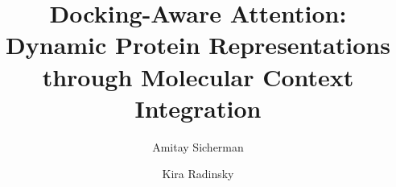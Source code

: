 \documentclass[sigconf]{acmart}
\begin{document}
\title{Docking-Aware Attention: Dynamic Protein Representations through Molecular Context Integration}

\author{Amitay Sicherman}


\author{Kira Radinsky}


\begin{abstract}




\end{abstract}
\end{document}
